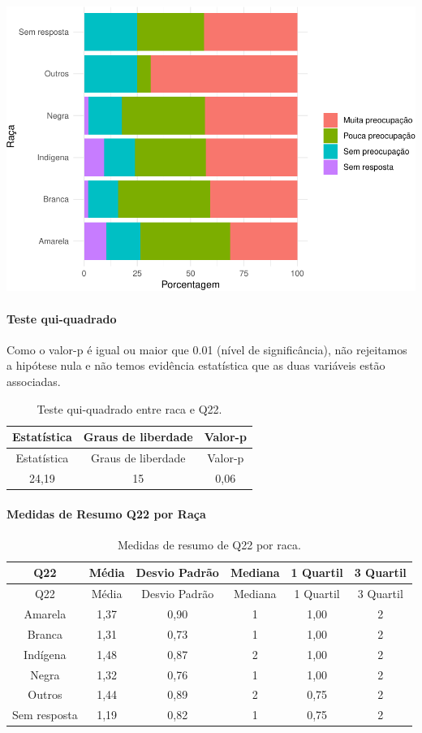 \documentclass[]{article}
\let\oldparagraph\paragraph
\renewcommand{\paragraph}[1]{\oldparagraph{#1}\mbox{}}
\begin{document}
\begin{center}\includegraphics[width=0.75\linewidth]{relatorio_covid19_files/figure-latex/unnamed-chunk-515-1} \end{center}

\hypertarget{teste-qui-quadrado-45}{%
\paragraph{Teste qui-quadrado}\label{teste-qui-quadrado-45}}

Como o valor-p é igual ou maior que 0.01 (nível de significância), não rejeitamos a hipótese nula e não temos evidência estatística que as duas variáveis estão associadas.

\begin{longtable}[]{@{}ccc@{}}
\caption{\label{tab:unnamed-chunk-517}Teste qui-quadrado entre raca e Q22.}\tabularnewline
\toprule
Estatística & Graus de liberdade & Valor-p\tabularnewline
\midrule
\endfirsthead
\toprule
Estatística & Graus de liberdade & Valor-p\tabularnewline
\midrule
\endhead
24,19 & 15 & 0,06\tabularnewline
\bottomrule
\end{longtable}

\cleardoublepage

\hypertarget{medidas-de-resumo-q22-por-rauxe7a}{%
\paragraph{Medidas de Resumo Q22 por Raça}\label{medidas-de-resumo-q22-por-rauxe7a}}

\begin{longtable}[]{@{}cccccc@{}}
\caption{\label{tab:unnamed-chunk-518}Medidas de resumo de Q22 por raca.}\tabularnewline
\toprule
Q22 & Média & Desvio Padrão & Mediana & 1 Quartil & 3 Quartil\tabularnewline
\midrule
\endfirsthead
\toprule
Q22 & Média & Desvio Padrão & Mediana & 1 Quartil & 3 Quartil\tabularnewline
\midrule
\endhead
Amarela & 1,37 & 0,90 & 1 & 1,00 & 2\tabularnewline
Branca & 1,31 & 0,73 & 1 & 1,00 & 2\tabularnewline
Indígena & 1,48 & 0,87 & 2 & 1,00 & 2\tabularnewline
Negra & 1,32 & 0,76 & 1 & 1,00 & 2\tabularnewline
Outros & 1,44 & 0,89 & 2 & 0,75 & 2\tabularnewline
Sem resposta & 1,19 & 0,82 & 1 & 0,75 & 2\tabularnewline
\bottomrule
\end{longtable}
\end{document}
